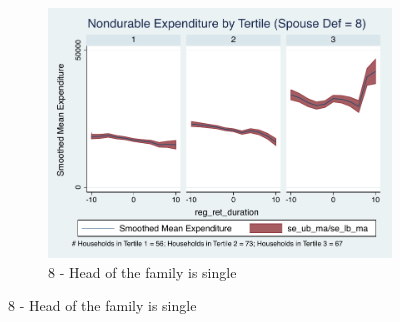 \documentclass[11pt,onecolumn]{article}
\numberwithin{figure}{section}
\begin{document}
\begin{figure}
\begin{subfigure}{1.0\textwidth}
	\caption{8 - Head of the family is single}
	\centering
	\includegraphics[width=0.8\linewidth]{../ConsumptionPostRetirement_by_SpouseDef/Smoothed/spouse_def_8.pdf}
	\end{subfigure}
	\vspace{1cm}
	

\end{figure}
\end{document}
